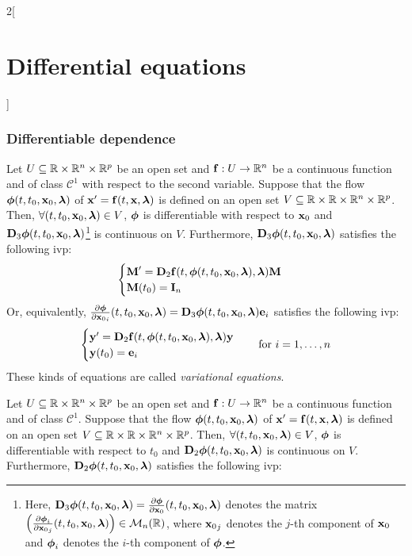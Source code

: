 \documentclass[../../../main.tex]{subfiles}
\begin{document}
\begin{multicols}{2}[\section{Differential equations}]
  \subsubsection{Differentiable dependence}
  \begin{theorem}[Dependence on $\vf{x}_0$]
    Let $U\subseteq\RR\times\RR^n\times\RR^p$ be an open set and $\vf{f}:U\rightarrow\RR^n$ be a continuous function and of class $\mathcal{C}^1$ with respect to the second variable. Suppose that the flow $\vf{\phi}(t,t_0,\vf{x}_0,\vf{\lambda})$ of $\vf{x}'=\vf{f}(t,\vf{x},\vf{\lambda})$ is defined on an open set $V\subseteq\RR\times\RR\times\RR^n\times\RR^p$. Then, $\forall (t,t_0,\vf{x}_0,\vf{\lambda})\in V$, $\vf{\phi}$ is differentiable with respect to $\vf{x}_0$ and $\vf{D}_3\vf{\phi}(t,t_0,\vf{x}_0,\vf{\lambda})$\footnote{Here, $\vf{D}_3\vf{\phi}(t,t_0,\vf{x}_0,\vf{\lambda})=\frac{\partial\vf{\phi}}{\partial \vf{x}_0}(t,t_0,\vf{x}_0,\vf{\lambda})$ denotes the matrix $\left(\frac{\partial\vf{\phi}_i}{\partial{\vf{x}_0}_j}(t,t_0,\vf{x}_0,\vf{\lambda})\right)\in\mathcal{M}_n(\RR)$, where ${\vf{x}_0}_j$ denotes the $j$-th component of $\vf{x}_0$ and $\vf{\phi}_i$ denotes the $i$-th component of $\vf{\phi}$.} is continuous on $V$. Furthermore, $\vf{D}_3\vf{\phi}(t,t_0,\vf{x}_0,\vf{\lambda})$ satisfies the following ivp:
    \begin{equation*}
      \begin{cases}
        \vf{M}'      =\vf{D}_2\vf{f}(t,\vf{\phi}(t,t_0,\vf{x}_0,\vf{\lambda}),\vf{\lambda})\vf{M} \\
        \vf{M}(t_0)  =\vf{I}_n
      \end{cases}
    \end{equation*}
    Or, equivalently, $\frac{\partial\vf{\phi}}{\partial {\vf{x}_0}_i}(t,t_0,\vf{x}_0,\vf{\lambda})=\vf{D}_3\vf{\phi}(t,t_0,\vf{x}_0,\vf{\lambda})\vf{e}_i$ satisfies the following ivp:
    $$
      \begin{cases}
        \vf{y}'      =\vf{D}_2\vf{f}(t,\vf{\phi}(t,t_0,\vf{x}_0,\vf{\lambda}),\vf{\lambda})\vf{y} \\
        \vf{y}(t_0)  =\vf{e}_i
      \end{cases}\quad\text{for }i=1,\ldots,n
    $$
    These kinds of equations are called \emph{variational equations}.
  \end{theorem}
  \begin{theorem}[Dependence on $t_0$]
    Let $U\subseteq\RR\times\RR^n\times\RR^p$ be an open set and $\vf{f}:U\rightarrow\RR^n$ be a continuous function and of class $\mathcal{C}^1$. Suppose that the flow $\vf{\phi}(t,t_0,\vf{x}_0,\vf{\lambda})$ of $\vf{x}'=\vf{f}(t,\vf{x},\vf{\lambda})$ is defined on an open set $V\subseteq\RR\times\RR\times\RR^n\times\RR^p$. Then, $\forall (t,t_0,\vf{x}_0,\vf{\lambda})\in V$, $\vf{\phi}$ is differentiable with respect to $t_0$ and $\vf{D}_2\vf{\phi}(t,t_0,\vf{x}_0,\vf{\lambda})$ is continuous on $V$. Furthermore, $\vf{D}_2\vf{\phi}(t,t_0,\vf{x}_0,\vf{\lambda})$ satisfies the following ivp:

\end{theorem}
\end{multicols}
\end{document}
